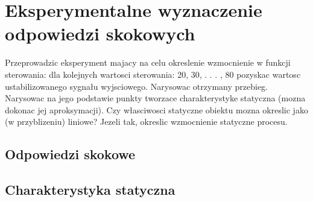 \section{Eksperymentalne wyznaczenie odpowiedzi skokowych}
\label{lab:zad2}

Przeprowadzic eksperyment majacy na celu okreslenie wzmocnienie w funkcji sterowania:
dla kolejnych wartosci sterowania: 20, 30, . . . , 80 pozyskac wartosc ustabilizowanego
sygnału wyjsciowego. Narysowac otrzymany przebieg. Narysowac na jego
podstawie punkty tworzace charakterystyke statyczna (mozna dokonac jej aproksymacji).
Czy własciwosci statyczne obiektu mozna okreslic jako (w przyblizeniu) liniowe?
Jezeli tak, okreslic wzmocnienie statyczne procesu.

%    

\subsection{Odpowiedzi skokowe}
\label{lab:zad2:odpSkok}


\newpage

\subsection{Charakterystyka statyczna}
\label{lab:zad2:charStat}



\newpage

